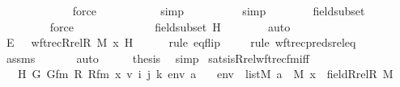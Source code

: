 \begin{isabellebody}
\ \ \ \ \ \ \ \ \ \ \ \isamarkupfalse%
\ force\isanewline
\ \ \ \ \ \ \ \ \ \isamarkupfalse%
\ simp\isanewline
\ \ \ \ \ \ \ \ \isamarkupfalse%
\ simp\isanewline
\ \ \ \ \ \ \isamarkupfalse%
\ fieldsubset\ \isanewline
\ \ \ \ \ \ \ \isamarkupfalse%
\ force\ \ \ \ \ \ \isanewline
\ \ \ \ \ \ \isamarkupfalse%
\ fieldsubset\ H\isanewline
\ \ \ \ \ \ \isamarkupfalse%
\ auto\isanewline
\ \ \isamarkupfalse%
\ \isanewline
\ \ \isamarkupfalse%
\ \isamarkupfalse%
\ E{}{\isacharcolon}{\kern0pt}\ {\isachardoublequoteopen}{\isachardot}{\kern0pt}{\isachardot}{\kern0pt}{\isachardot}{\kern0pt}\ {\isacharequal}{\kern0pt}\ wftrec{\isacharparenleft}{\kern0pt}Rrel{\isacharparenleft}{\kern0pt}R{\isacharcomma}{\kern0pt}\ M{\isacharparenright}{\kern0pt}{\isacharcomma}{\kern0pt}\ x{\isacharcomma}{\kern0pt}\ H{\isacharparenright}{\kern0pt}{\isachardoublequoteclose}\ \isanewline
\ \ \ \ \isamarkupfalse%
{\isacharparenleft}{\kern0pt}rule\ eq{\isacharunderscore}{\kern0pt}flip{\isacharparenright}{\kern0pt}\isanewline
\ \ \ \ \isamarkupfalse%
{\isacharparenleft}{\kern0pt}rule\ wftrec{\isacharunderscore}{\kern0pt}preds{\isacharunderscore}{\kern0pt}rel{\isacharunderscore}{\kern0pt}eq{\isacharparenright}{\kern0pt}\isanewline
\ \ \ \ \isamarkupfalse%
\ assms\ \isanewline
\ \ \ \ \isamarkupfalse%
\ auto\isanewline
\ \ \isamarkupfalse%
\ \isamarkupfalse%
\ {\isacharquery}{\kern0pt}thesis\ \isamarkupfalse%
\ simp\isanewline
{}\isamarkupfalse%
%
\endisatagproof
{\isafoldproof}%
%
\isadelimproof
\isanewline
%
\endisadelimproof
\isanewline
{}\isamarkupfalse%
\ sats{\isacharunderscore}{\kern0pt}is{\isacharunderscore}{\kern0pt}Rrel{\isacharunderscore}{\kern0pt}wftrec{\isacharunderscore}{\kern0pt}fm{\isacharunderscore}{\kern0pt}iff\ {\isacharcolon}{\kern0pt}\isanewline
\ \ \ H\ G\ Gfm\ R\ Rfm\ x\ v\ i\ j\ k\ env\ a\isanewline
\ \ \ {\isachardoublequoteopen}env\ {\isasymin}\ list{\isacharparenleft}{\kern0pt}M{\isacharparenright}{\kern0pt}{\isachardoublequoteclose}\ {\isachardoublequoteopen}a\ {\isasymin}\ M{\isachardoublequoteclose}\ {\isachardoublequoteopen}x\ {\isasymin}\ field{\isacharparenleft}{\kern0pt}Rrel{\isacharparenleft}{\kern0pt}R{\isacharcomma}{\kern0pt}\ M{\isacharparenright}{\kern0pt}{\isacharparenright}{\kern0pt}{\isachardoublequoteclose}\ \isanewline

\end{isabellebody}
